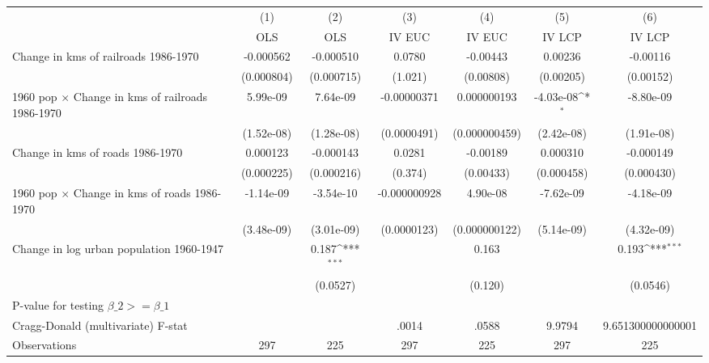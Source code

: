 {
\def\sym#1{\ifmmode^{#1}\else\(^{#1}\)\fi}
\begin{tabular}{l*{6}{c}}
\hline\hline
                &\multicolumn{1}{c}{(1)}&\multicolumn{1}{c}{(2)}&\multicolumn{1}{c}{(3)}&\multicolumn{1}{c}{(4)}&\multicolumn{1}{c}{(5)}&\multicolumn{1}{c}{(6)}\\
                &\multicolumn{1}{c}{OLS}&\multicolumn{1}{c}{OLS}&\multicolumn{1}{c}{IV EUC}&\multicolumn{1}{c}{IV EUC}&\multicolumn{1}{c}{IV LCP}&\multicolumn{1}{c}{IV LCP}\\
\hline
Change in kms of railroads 1986-1970&-0.000562         &-0.000510         &   0.0780         & -0.00443         &  0.00236         & -0.00116         \\
                &(0.000804)         &(0.000715)         &  (1.021)         &(0.00808)         &(0.00205)         &(0.00152)         \\
[1em]
1960 pop $\times$ Change in kms of railroads 1986-1970& 5.99e-09         & 7.64e-09         &-0.00000371         &0.000000193         &-4.03e-08\sym{*}  &-8.80e-09         \\
                &(1.52e-08)         &(1.28e-08)         &(0.0000491)         &(0.000000459)         &(2.42e-08)         &(1.91e-08)         \\
[1em]
Change in kms of roads 1986-1970& 0.000123         &-0.000143         &   0.0281         & -0.00189         & 0.000310         &-0.000149         \\
                &(0.000225)         &(0.000216)         &  (0.374)         &(0.00433)         &(0.000458)         &(0.000430)         \\
[1em]
1960 pop $\times$ Change in kms of roads 1986-1970&-1.14e-09         &-3.54e-10         &-0.000000928         & 4.90e-08         &-7.62e-09         &-4.18e-09         \\
                &(3.48e-09)         &(3.01e-09)         &(0.0000123)         &(0.000000122)         &(5.14e-09)         &(4.32e-09)         \\
[1em]
Change in log urban population 1960-1947&                  &    0.187\sym{***}&                  &    0.163         &                  &    0.193\sym{***}\\
                &                  & (0.0527)         &                  &  (0.120)         &                  & (0.0546)         \\
\hline
P-value for testing $\beta\_{2} >= \beta\_{1}$&                  &                  &                  &                  &                  &                  \\
Cragg-Donald (multivariate) F-stat&                  &                  &    .0014         &    .0588         &   9.9794         &9.651300000000001         \\
Observations    &      297         &      225         &      297         &      225         &      297         &      225         \\
\hline\hline
\end{tabular}
}
